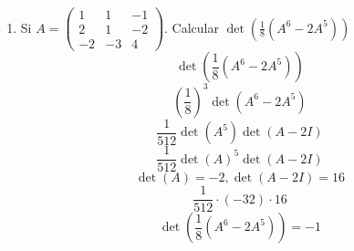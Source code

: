 \documentclass[../practica.root.tex]{subfiles}
\begin{document}
\begin{enumerate}
    \item Si $A = \begin{pmatrix}
              1  & 1  & -1 \\
              2  & 1  & -2 \\
              -2 & -3 & 4
          \end{pmatrix}$. Calcular $ \det\left(\frac{1}{8}(A^6 - 2A^5)\right) $
          \[ \det\left(\frac{1}{8}(A^6 - 2A^5)\right) \]
          \[ (\frac{1}{8})^3\det(A^6 - 2A^5) \]
          \[ \frac{1}{512}\det(A^5)\det(A - 2I) \]
          \[ \frac{1}{512}\det(A)^5\det(A - 2I) \]
          \[
              \det(A) = -2, \det(A - 2I) = 16
          \]
          \[ \frac{1}{512}\cdot(-32)\cdot 16 \]
          \[ \boxed{\det\left(\frac{1}{8}(A^6 - 2A^5)\right) = -1} \]

\end{enumerate}
\end{document}
